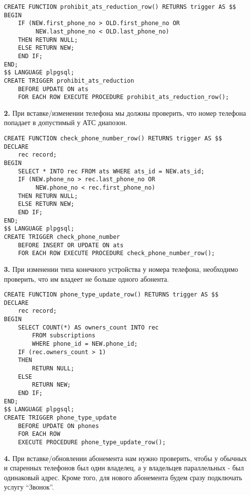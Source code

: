 \documentclass{report}
\begin{document}
\begin{lstlisting}
CREATE FUNCTION prohibit_ats_reduction_row() RETURNS trigger AS $$
BEGIN
    IF (NEW.first_phone_no > OLD.first_phone_no OR
         NEW.last_phone_no < OLD.last_phone_no)
    THEN RETURN NULL;
    ELSE RETURN NEW;
    END IF;
END;
$$ LANGUAGE plpgsql;
CREATE TRIGGER prohibit_ats_reduction 
    BEFORE UPDATE ON ats
    FOR EACH ROW EXECUTE PROCEDURE prohibit_ats_reduction_row();
\end{lstlisting}

\textbf{2.} При вставке/изменении телефона мы должны проверить, 
что номер телефона попадает в допустимый у АТС диапозон.

\begin{lstlisting}
CREATE FUNCTION check_phone_number_row() RETURNS trigger AS $$
DECLARE
    rec record;
BEGIN
    SELECT * INTO rec FROM ats WHERE ats_id = NEW.ats_id;
    IF (NEW.phone_no > rec.last_phone_no OR
         NEW.phone_no < rec.first_phone_no)
    THEN RETURN NULL;
    ELSE RETURN NEW;
    END IF;
END;
$$ LANGUAGE plpgsql;
CREATE TRIGGER check_phone_number 
    BEFORE INSERT OR UPDATE ON ats
    FOR EACH ROW EXECUTE PROCEDURE check_phone_number_row();
\end{lstlisting}

\textbf{3.} При изменении типа конечного устройства у номера телефона, 
необходимо проверить, что им владеет не больше одного абонента.

\begin{lstlisting}
CREATE FUNCTION phone_type_update_row() RETURNS trigger AS $$
DECLARE
    rec record;
BEGIN
    SELECT COUNT(*) AS owners_count INTO rec 
        FROM subscriptions
        WHERE phone_id = NEW.phone_id;
    IF (rec.owners_count > 1)
    THEN
        RETURN NULL;
    ELSE
        RETURN NEW;
    END IF;
END;
$$ LANGUAGE plpgsql;
CREATE TRIGGER phone_type_update 
    BEFORE UPDATE ON phones
    FOR EACH ROW 
    EXECUTE PROCEDURE phone_type_update_row();
\end{lstlisting}

\textbf{4.} При вставке/обновлении абонемента нам нужно проверить, 
чтобы у обычных и спаренных телефонов был один владелец, 
а у владельцев параллельных - был одинаковый адрес. 
Кроме того, для нового абонемента
будем сразу подключать услугу ``Звонок''.
\end{document}
